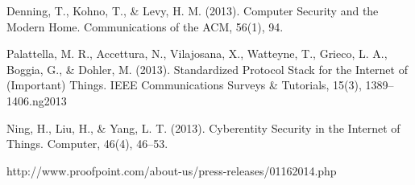 \documentclass[11pt,journal,compsoc]{IEEEtran}
\begin{document}
%
%
%
\begin{thebibliography}{1}

Denning, T., Kohno, T., \& Levy, H. M. (2013). Computer Security and the Modern Home. Communications of the ACM, 56(1), 94. 


Palattella, M. R., Accettura, N., Vilajosana, X., Watteyne, T., Grieco, L. A., Boggia, G., \& Dohler, M. (2013). Standardized Protocol Stack for the Internet of (Important) Things. IEEE Communications Surveys \& Tutorials, 15(3), 1389–1406.ng2013 

Ning, H., Liu, H., \& Yang, L. T. (2013). Cyberentity Security in the Internet of Things. Computer, 46(4), 46–53. 

http://www.proofpoint.com/about-us/press-releases/01162014.php


\end{thebibliography}



\end{document}
